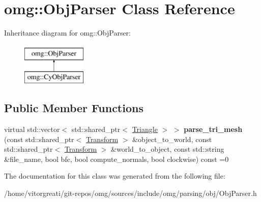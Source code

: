 \hypertarget{classomg_1_1_obj_parser}{}\section{omg\+::Obj\+Parser Class Reference}
\label{classomg_1_1_obj_parser}
Inheritance diagram for omg\+::Obj\+Parser\+:\begin{figure}[H]
\begin{center}
\leavevmode
\includegraphics[height=2.000000cm]{classomg_1_1_obj_parser}
\end{center}
\end{figure}
\subsection*{Public Member Functions}
\begin{DoxyCompactItemize}
\item 
\mbox{\label{classomg_1_1_obj_parser_afef9b4a3888a0d2c1aa395883473ff03}} 
virtual std\+::vector$<$ std\+::shared\+\_\+ptr$<$ \mbox{\hyperlink{classomg_1_1_triangle}{Triangle}} $>$ $>$ {\bfseries parse\+\_\+tri\+\_\+mesh} (const std\+::shared\+\_\+ptr$<$ \mbox{\hyperlink{classomg_1_1_transform}{Transform}} $>$ \&object\+\_\+to\+\_\+world, const std\+::shared\+\_\+ptr$<$ \mbox{\hyperlink{classomg_1_1_transform}{Transform}} $>$ \&world\+\_\+to\+\_\+object, const std\+::string \&file\+\_\+name, bool bfc, bool compute\+\_\+normals, bool clockwise) const =0
\end{DoxyCompactItemize}


The documentation for this class was generated from the following file\+:\begin{DoxyCompactItemize}
\item 
/home/vitorgreati/git-\/repos/omg/sources/include/omg/parsing/obj/Obj\+Parser.\+h\end{DoxyCompactItemize}
